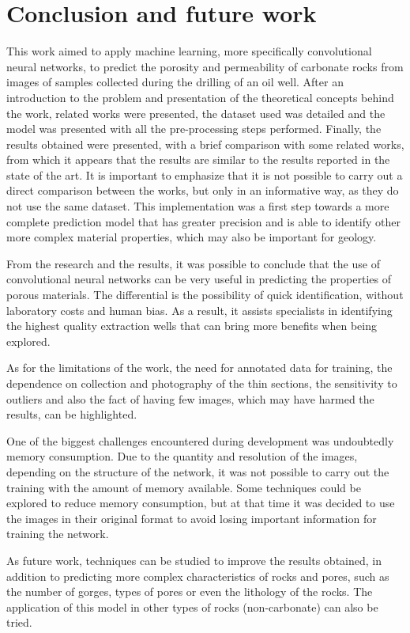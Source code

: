 \documentclass[a4paper,fleqn]{cas-sc}
\begin{document}
\section{Conclusion and future work}
This work aimed to apply machine learning, more specifically convolutional neural networks, to predict the porosity and permeability of carbonate rocks from images of samples collected during the drilling of an oil well. After an introduction to the problem and presentation of the theoretical concepts behind the work, related works were presented, the dataset used was detailed and the model was presented with all the pre-processing steps performed. Finally, the results obtained were presented, with a brief comparison with some related works, from which it appears that the results are similar to the results reported in the state of the art. It is important to emphasize that it is not possible to carry out a direct comparison between the works, but only in an informative way, as they do not use the same dataset. This implementation was a first step towards a more complete prediction model that has greater precision and is able to identify other more complex material properties, which may also be important for geology.

From the research and the results, it was possible to conclude that the use of convolutional neural networks can be very useful in predicting the properties of porous materials. The differential is the possibility of quick identification, without laboratory costs and human bias. As a result, it assists specialists in identifying the highest quality extraction wells that can bring more benefits when being explored.

As for the limitations of the work, the need for annotated data for training, the dependence on collection and photography of the thin sections, the sensitivity to outliers and also the fact of having few images, which may have harmed the results, can be highlighted.

One of the biggest challenges encountered during development was undoubtedly memory consumption. Due to the quantity and resolution of the images, depending on the structure of the network, it was not possible to carry out the training with the amount of memory available. Some techniques could be explored to reduce memory consumption, but at that time it was decided to use the images in their original format to avoid losing important information for training the network.

As future work, techniques can be studied to improve the results obtained, in addition to predicting more complex characteristics of rocks and pores, such as the number of gorges, types of pores or even the lithology of the rocks. The application of this model in other types of rocks (non-carbonate) can also be tried.
\end{document}
